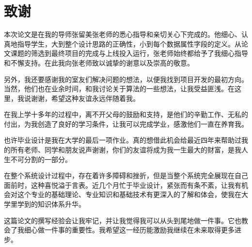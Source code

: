 \section*{致谢}

本次论文是在我的导师张留美张老师的悉心指导和亲切关心下完成的。他细心、认真地指导学生，大到整个设计思路的正确性，小到每个数据属性字段的定义。从论文课题的筛选到最终项目的完成与上线投入运行，张老师始终都给予了我细心指导和不懈支持。在此我向张老师致以诚挚的谢意以及崇高的敬意。

另外，我还要感谢我的室友们解决问题的想法，以便我找到项目开发的最初方向。当然，他们也在业余时间，和我讨论关于算法的一些想法，让我受益匪浅。在这里，我说谢谢，希望这种友谊永远伴随着我。

在我上学十多年的过程中，离不开父母的鼓励和支持，是他们的辛勤工作、无私的付出，为我创造了良好的学习条件，让我可以完成学业，感激他们一直在养育我。

也许毕业设计是我在大学的最后一项作业。真的想借此机会给最近四年来帮助过我的所有老师、同学和朋友说声谢谢，你们的友谊将成为我一生最大的财富，是我人生不可分割的一部分。

在整个系统设计过程中，存在着许多障碍和挫折，但是当整个系统完全展现在自己面前时，这种喜悦溢于言表。近几个月忙于毕业设计，紧张而有条不紊，让我有机会对这个专业的基础理论、专业知识和基础技术有更深入的了解和体会，使我在大学里学到的知识体系升华。

这篇论文的撰写经验会让我牢记，并让我觉得我可以从头到尾地做一件事。它也教会了我细心做一件事的重要性。我希望这一经历能激励我继续在未来取得更多进步。
